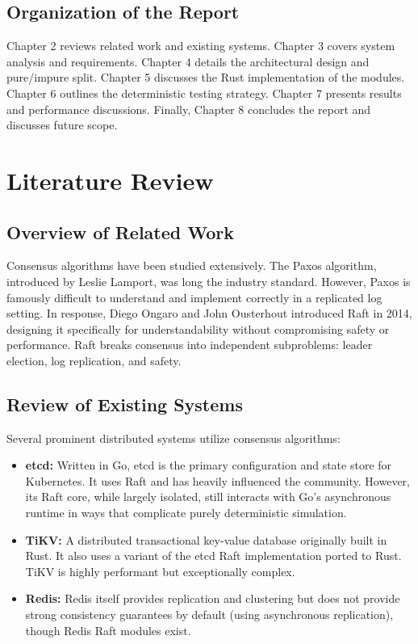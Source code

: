 \documentclass[12pt,a4paper]{report}
\begin{document}
\section{Organization of the Report}
Chapter 2 reviews related work and existing systems. Chapter 3 covers system analysis and requirements. Chapter 4 details the architectural design and pure/impure split. Chapter 5 discusses the Rust implementation of the modules. Chapter 6 outlines the deterministic testing strategy. Chapter 7 presents results and performance discussions. Finally, Chapter 8 concludes the report and discusses future scope.

\chapter{Literature Review}

\section{Overview of Related Work}
Consensus algorithms have been studied extensively. The Paxos algorithm, introduced by Leslie Lamport, was long the industry standard. However, Paxos is famously difficult to understand and implement correctly in a replicated log setting. In response, Diego Ongaro and John Ousterhout introduced Raft in 2014, designing it specifically for understandability without compromising safety or performance. Raft breaks consensus into independent subproblems: leader election, log replication, and safety.

\section{Review of Existing Systems}
Several prominent distributed systems utilize consensus algorithms:
\begin{itemize}
    \item \textbf{etcd:} Written in Go, etcd is the primary configuration and state store for Kubernetes. It uses Raft and has heavily influenced the community. However, its Raft core, while largely isolated, still interacts with Go's asynchronous runtime in ways that complicate purely deterministic simulation.
    \item \textbf{TiKV:} A distributed transactional key-value database originally built in Rust. It also uses a variant of the etcd Raft implementation ported to Rust. TiKV is highly performant but exceptionally complex.
    \item \textbf{Redis:} Redis itself provides replication and clustering but does not provide strong consistency guarantees by default (using asynchronous replication), though Redis Raft modules exist.
\end{itemize}
\end{document}
